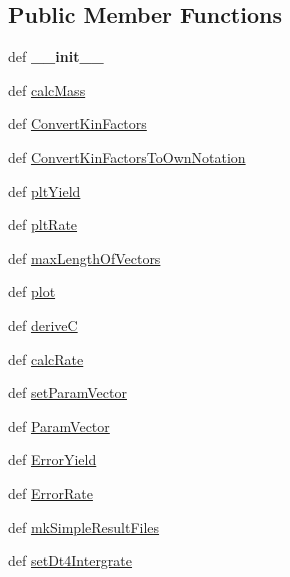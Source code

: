 \subsection*{\-Public \-Member \-Functions}
\begin{DoxyCompactItemize}
\item 
\hypertarget{classModels_1_1ArrheniusModelAlternativeNotation1_ab492f16aad89e9c4a5bee8b2034c10c1}{def {\bfseries \-\_\-\-\_\-init\-\_\-\-\_\-}}\label{classModels_1_1ArrheniusModelAlternativeNotation1_ab492f16aad89e9c4a5bee8b2034c10c1}

\item 
def \hyperlink{classModels_1_1ArrheniusModelAlternativeNotation1_a977524416ab6b41aa7ca01c844074123}{calc\-Mass}
\item 
def \hyperlink{classModels_1_1ArrheniusModelAlternativeNotation1_a81e74ccd401041164b6a9d697e836397}{\-Convert\-Kin\-Factors}
\item 
def \hyperlink{classModels_1_1ArrheniusModelAlternativeNotation1_a2f46b8d8a2f59735e2053a85bc18fec9}{\-Convert\-Kin\-Factors\-To\-Own\-Notation}
\item 
def \hyperlink{classModels_1_1Model_a317ed848b969dbe3a96dd05e8b771900}{plt\-Yield}
\item 
def \hyperlink{classModels_1_1Model_aa35c741babf8f141df48c4021e0664e4}{plt\-Rate}
\item 
def \hyperlink{classModels_1_1Model_a3396d6ca1a7b7d66e55ada8c3c7a509e}{max\-Length\-Of\-Vectors}
\item 
def \hyperlink{classModels_1_1Model_ae404a691e48bfe4eafcdfdd09f1dae48}{plot}
\item 
def \hyperlink{classModels_1_1Model_a010945ed2adff59a7a5fce36025e7a97}{derive\-C}
\item 
def \hyperlink{classModels_1_1Model_a7c9280e33f9e0d46703cebc131008c65}{calc\-Rate}
\item 
def \hyperlink{classModels_1_1Model_a818f207e2a4bd0e9a3720ca611960e5a}{set\-Param\-Vector}
\item 
def \hyperlink{classModels_1_1Model_a13c76a0fe24d43cdc4d21fbc73fa96fa}{\-Param\-Vector}
\item 
def \hyperlink{classModels_1_1Model_ad3e627980d9e781bf7b2c9ff900ca06b}{\-Error\-Yield}
\item 
def \hyperlink{classModels_1_1Model_a3050eb39341f318d8d88b172f88bd240}{\-Error\-Rate}
\item 
def \hyperlink{classModels_1_1Model_adcb987bccae63a742490ea1e6d5f7a74}{mk\-Simple\-Result\-Files}
\item 
def \hyperlink{classModels_1_1Model_ac28252ae5cd6b5ecd4c5d006a0e6567d}{set\-Dt4\-Intergrate}
\end{DoxyCompactItemize}
